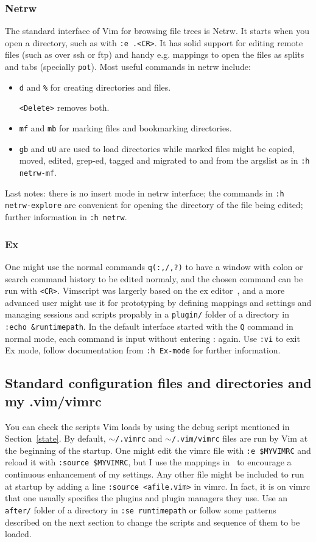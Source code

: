 \documentclass{article}
\newcommand{\ttt}[1] {
	\texttt{<#1>}}
\newcommand{\tttt}[1]{\texttt{#1}}
\begin{document}
\subsubsection{Netrw}\label{netrw}
The standard interface of Vim for browsing file trees is Netrw.
It starts when you open a directory, such as with \tttt{:e .<CR>}.
It has solid support for editing remote files (such as over ssh or
ftp) and handy e.g. mappings to open the files as splits and tabs (specially \tttt{pot}).
Most useful commands in netrw include:
\begin{itemize}
  \item \tttt{d} and \tttt{\%} for creating directories and files.
    \ttt{Delete} removes both.
  \item \tttt{mf} and \tttt{mb} for marking files and bookmarking directories.
  \item \tttt{gb} and \tttt{uU} are used to load directories
    while marked files might be copied, moved, edited, grep-ed, tagged and migrated
    to and from the argslist as in \tttt{:h netrw-mf}.
\end{itemize}
Last notes:
there is no insert mode in netrw interface;
the commands in \tttt{:h netrw-explore} are
convenient for opening the directory of the
file being edited;
further information in \tttt{:h netrw}.

\subsubsection{Ex}
One might use the normal commands \tttt{q(:,/,?)} to have a window
with colon or search command history to be edited normaly,
and the chosen command can be run with \ttt{CR}.
Vimscript was largerly based on the ex editor~\cite{ex},
and a more advanced user might use it for prototyping
by defining mappings and settings and managing sessions and scripts
propably in a \tttt{plugin/} folder of a directory in \tttt{:echo \&runtimepath}.
In the default interface started with the \tttt{Q} command in normal mode,
each command is input without entering : again. Use \tttt{:vi} to exit Ex mode,
follow documentation from \tttt{:h Ex-mode} for further information.

\subsection{Standard configuration files and directories and my .vim/vimrc}
You can check the scripts Vim loads by using the debug script mentioned
in Section~\ref{state}.
By default, \tttt{$\sim$/.vimrc} and \tttt{$\sim$/.vim/vimrc} files are run by Vim at the beginning of the startup.
One might edit the vimrc file with \tttt{:e \$MYVIMRC}
and reload it with \tttt{:source \$MYVIMRC}, but
I use the mappings in~\cite{vimrc} to encourage a continuous enhancement of my settings.
Any other file might be included to run at startup by
adding a line \tttt{:source <afile.vim>} in vimrc.
In fact, it is on vimrc that one usually specifies the plugins
and plugin managers they use.
Use an \tttt{after/} folder of a directory in \tttt{:se runtimepath}
or follow some patterns described on the next section to change the
scripts and sequence of them to be loaded.
\end{document}
